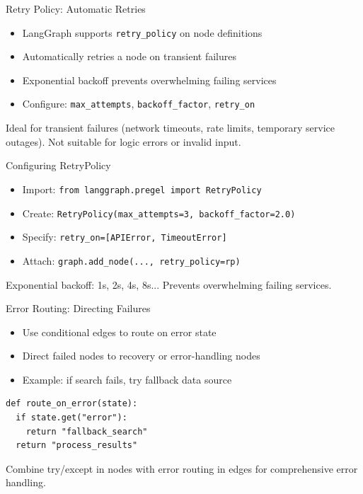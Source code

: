 \documentclass[aspectratio=169,11pt]{beamer}
\begin{document}
\begin{frame}{Retry Policy: Automatic Retries}
\setlength{\itemsep}{1pt}
\begin{itemize}
\item LangGraph supports \texttt{retry\_policy} on node definitions
\item Automatically retries a node on transient failures
\item Exponential backoff prevents overwhelming failing services
\item Configure: \texttt{max\_attempts}, \texttt{backoff\_factor}, \texttt{retry\_on}
\end{itemize}
\vspace{0.15cm}
\begin{conceptbox}
Ideal for transient failures (network timeouts, rate limits, temporary service outages). Not suitable for logic errors or invalid input.
\end{conceptbox}
\end{frame}

\begin{frame}{Configuring RetryPolicy}
\setlength{\itemsep}{1pt}
\begin{itemize}
\item Import: \texttt{from langgraph.pregel import RetryPolicy}
\item Create: \texttt{RetryPolicy(max\_attempts=3, backoff\_factor=2.0)}
\item Specify: \texttt{retry\_on=[APIError, TimeoutError]}
\item Attach: \texttt{graph.add\_node(..., retry\_policy=rp)}
\end{itemize}
\vspace{0.1cm}
\begin{tipbox}
Exponential backoff: 1s, 2s, 4s, 8s... Prevents overwhelming failing services.
\end{tipbox}
\end{frame}

\begin{frame}[fragile]{Error Routing: Directing Failures}
\setlength{\itemsep}{1pt}
\begin{itemize}
\item Use conditional edges to route on error state
\item Direct failed nodes to recovery or error-handling nodes
\item Example: if search fails, try fallback data source
\end{itemize}
\vspace{0.15cm}
\begin{codebox}
\begin{lstlisting}
def route_on_error(state):
  if state.get("error"):
    return "fallback_search"
  return "process_results"
\end{lstlisting}
\end{codebox}
\vspace{0.1cm}
\begin{tipbox}[Tip]
Combine try/except in nodes with error routing in edges for comprehensive error handling.
\end{tipbox}
\end{frame}
\end{document}
